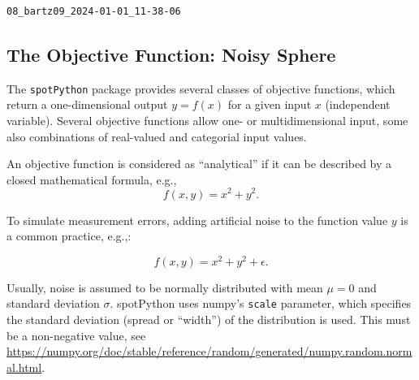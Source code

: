 \documentclass[
  letterpaper,
  DIV=11,
  numbers=noendperiod]{scrreprt}
\begin{document}
\begin{verbatim}
08_bartz09_2024-01-01_11-38-06
\end{verbatim}

\hypertarget{the-objective-function-noisy-sphere}{%
\subsection{The Objective Function: Noisy
Sphere}\label{the-objective-function-noisy-sphere}}

The \texttt{spotPython} package provides several classes of objective
functions, which return a one-dimensional output \(y=f(x)\) for a given
input \(x\) (independent variable). Several objective functions allow
one- or multidimensional input, some also combinations of real-valued
and categorial input values.

An objective function is considered as ``analytical'' if it can be
described by a closed mathematical formula, e.g., \[
f(x, y) = x^2 + y^2.
\]

To simulate measurement errors, adding artificial noise to the function
value \(y\) is a common practice, e.g.,:

\[
f(x, y) = x^2 + y^2 + \epsilon.
\]

Usually, noise is assumed to be normally distributed with mean \(\mu=0\)
and standard deviation \(\sigma\). spotPython uses numpy's
\texttt{scale} parameter, which specifies the standard deviation (spread
or ``width'') of the distribution is used. This must be a non-negative
value, see
\url{https://numpy.org/doc/stable/reference/random/generated/numpy.random.normal.html}.
\end{document}

